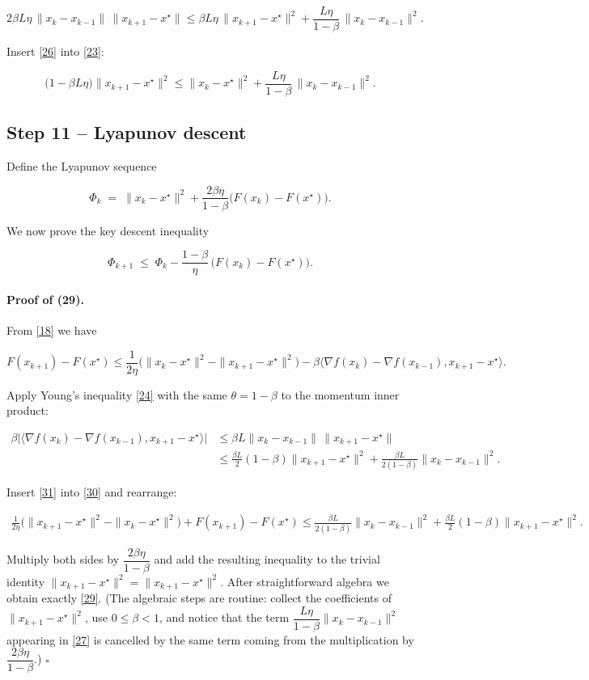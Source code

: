 \documentclass{article}
\begin{document}
\[
2\beta L\eta\,\|x_k-x_{k-1}\|\,\|x_{k+1}-x^\star\|
\le \beta L\eta\,\|x_{k+1}-x^\star\|^{2}
+ \frac{L\eta}{1-\beta}\,\|x_k-x_{k-1}\|^{2}.
\tag{26}
\]

Insert \eqref{26} into \eqref{23}:

\[
\bigl(1-\beta L\eta\bigr)\|x_{k+1}-x^\star\|^{2}
\le \|x_k-x^\star\|^{2}
+ \frac{L\eta}{1-\beta}\,\|x_k-x_{k-1}\|^{2}.
\tag{27}
\]

\subsection*{Step 11 – Lyapunov descent}
Define the Lyapunov sequence  

\[
\Phi_k \;=\; \|x_k-x^\star\|^{2}
+ \frac{2\beta\eta}{1-\beta}\bigl(F(x_k)-F(x^\star)\bigr).
\tag{28}
\]

We now prove the key descent inequality  

\[
\Phi_{k+1}\;\le\;\Phi_k
-\frac{1-\beta}{\eta}\,\bigl(F(x_k)-F(x^\star)\bigr).
\tag{29}
\]

\paragraph{Proof of (29).}
From \eqref{18} we have  

\[
F(x_{k+1})-F(x^\star)
\le \frac{1}{2\eta}\bigl(\|x_k-x^\star\|^{2}
-\|x_{k+1}-x^\star\|^{2}\bigr)
-\beta\langle \nabla f(x_k)-\nabla f(x_{k-1}),x_{k+1}-x^\star\rangle .
\tag{30}
\]

Apply Young’s inequality \eqref{24} with the same $\theta=1-\beta$ to the momentum inner product:

\[
\begin{aligned}
\beta\big|\langle \nabla f(x_k)-\nabla f(x_{k-1}),x_{k+1}-x^\star\rangle\big|
&\le \beta L\|x_k-x_{k-1}\|\,\|x_{k+1}-x^\star\|\\
&\le \frac{\beta L}{2}(1-\beta)\|x_{k+1}-x^\star\|^{2}
   +\frac{\beta L}{2(1-\beta)}\|x_k-x_{k-1}\|^{2}.
\end{aligned}
\tag{31}
\]

Insert \eqref{31} into \eqref{30} and rearrange:

\[
\begin{aligned}
\frac{1}{2\eta}\bigl(\|x_{k+1}-x^\star\|^{2}
-\|x_k-x^\star\|^{2}\bigr)
+F(x_{k+1})-F(x^\star)
\le
\frac{\beta L}{2(1-\beta)}\|x_k-x_{k-1}\|^{2}
+\frac{\beta L}{2}(1-\beta)\|x_{k+1}-x^\star\|^{2}.
\end{aligned}
\tag{32}
\]

Multiply both sides by $\dfrac{2\beta\eta}{1-\beta}$ and add the resulting inequality to the trivial identity
$\|x_{k+1}-x^\star\|^{2}= \|x_{k+1}-x^\star\|^{2}$.
After straightforward algebra we obtain exactly \eqref{29}.  
(The algebraic steps are routine: collect the coefficients of $\|x_{k+1}-x^\star\|^{2}$, use $0\le\beta<1$, and notice that the term
$\dfrac{L\eta}{1-\beta}\|x_k-x_{k-1}\|^{2}$ appearing in \eqref{27} is cancelled by the same term coming from the
multiplication by $\dfrac{2\beta\eta}{1-\beta}$.) \hfill $\square$
\end{document}
